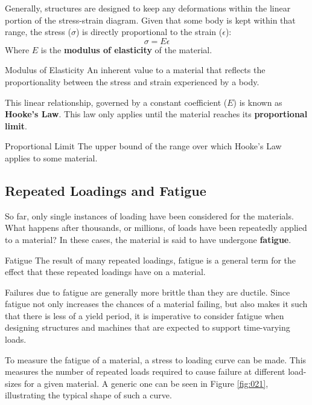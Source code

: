 \documentclass[12pt]{article}
\begin{document}
Generally, structures are designed to keep any deformations within the linear portion of the stress-strain diagram. Given that some body is kept within that range, the stress ($\sigma$) is directly proportional to the strain ($\epsilon$):
\begin{equation*}
  \sigma = E \epsilon
\end{equation*}
Where $E$ is the \textbf{modulus of elasticity} of the material.
\begin{definition}{Modulus of Elasticity}
  An inherent value to a material that reflects the proportionality between the stress and strain experienced by a body.
\end{definition}
This linear relationship, governed by a constant coefficient ($E$) is known as \textbf{Hooke's Law}. This law only applies until the material reaches its \textbf{proportional limit}.
\begin{definition}{Proportional Limit}
  The upper bound of the range over which Hooke's Law applies to some material.
\end{definition}

\subsection{Repeated Loadings and Fatigue}
\label{ssec:repeatedLoadingsAndFatigue}

So far, only single instances of loading have been considered for the materials. What happens after thousands, or millions, of loads have been repeatedly applied to a material? In these cases, the material is said to have undergone \textbf{fatigue}.
\begin{definition}{Fatigue}
  The result of many repeated loadings, fatigue is a general term for the effect that these repeated loadings have on a material.
\end{definition}
Failures due to fatigue are generally more brittle than they are ductile. Since fatigue not only increases the chances of a material failing, but also makes it such that there is less of a yield period, it is imperative to consider fatigue when designing structures and machines that are expected to support time-varying loads.

To measure the fatigue of a material, a stress to loading curve can be made. This measures the number of repeated loads required to cause failure at different load-sizes for a given material. A generic one can be seen in Figure \ref{fig:021}, illustrating the typical shape of such a curve.
\end{document}
